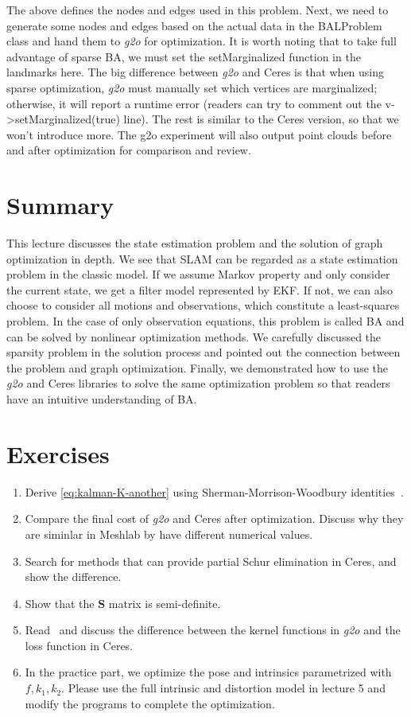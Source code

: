 The above defines the nodes and edges used in this problem. Next, we need to generate some nodes and edges based on the actual data in the BALProblem class and hand them to \textit{g2o} for optimization. It is worth noting that to take full advantage of sparse BA, we must set the setMarginalized function in the landmarks here. The big difference between \textit{g2o} and Ceres is that when using sparse optimization, \textit{g2o} must manually set which vertices are marginalized; otherwise, it will report a runtime error (readers can try to comment out the v->setMarginalized(true) line). The rest is similar to the Ceres version, so that we won't introduce more. The g2o experiment will also output point clouds before and after optimization for comparison and review.

\section{Summary}
This lecture discusses the state estimation problem and the solution of graph optimization in depth. We see that SLAM can be regarded as a state estimation problem in the classic model. If we assume Markov property and only consider the current state, we get a filter model represented by EKF. If not, we can also choose to consider all motions and observations, which constitute a least-squares problem. In the case of only observation equations, this problem is called BA and can be solved by nonlinear optimization methods. We carefully discussed the sparsity problem in the solution process and pointed out the connection between the problem and graph optimization. Finally, we demonstrated how to use the \textit{g2o} and Ceres libraries to solve the same optimization problem so that readers have an intuitive understanding of BA.

\section*{Exercises}
\begin{enumerate}
	\item Derive \eqref{eq:kalman-K-another} using Sherman-Morrison-Woodbury identities~\cite{Sherman1950, Barfoot2016}.
	\item 
	Compare the final cost of \textit{g2o} and Ceres after optimization. Discuss why they are siminlar in Meshlab by have different numerical values.
	\item 
	Search for methods that can provide partial Schur elimination in Ceres, and show the difference. 
	\item Show that the $\mathbf{S}$ matrix is semi-definite. 
	\item Read~\cite{Kummerle2011} and discuss the difference between the kernel functions in \textit{g2o} and the loss function in Ceres.
	\item[\optional] In the practice part, we optimize the pose and intrinsics parametrized with $f, k_1, k_2$. Please use the full intrinsic and distortion model in lecture 5 and modify the programs to complete the optimization. 
\end{enumerate}

